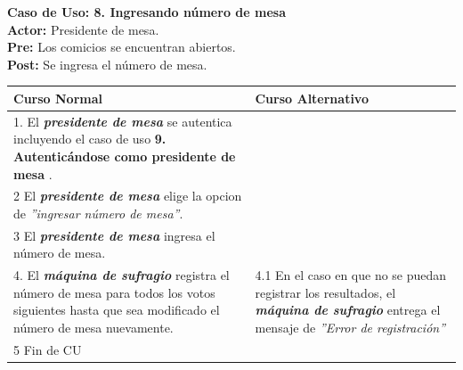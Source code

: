 \documentclass[spanish, 10pt,a4paper]{article}
\numberwithin{equation}{section} %
\begin{document}
\clearpage
\noindent\textbf{Caso de Uso: 8. Ingresando número de mesa}\\
\textbf{Actor: } Presidente de mesa.\\
\textbf{Pre: } Los comicios se encuentran abiertos.\\
\textbf{Post: } Se ingresa el número de mesa.\\
\begin{table}[H]
  \centering
\bgroup
\def\arraystretch{1.3}
  \begin{tabular}{p{9cm} | p{7cm}}
    \hline
    Curso Normal & Curso Alternativo \\
    \hline
    \hline    
    1. El \textbf{\textit{presidente de mesa}} se autentica incluyendo el caso de uso \textbf{ 9. Autenticándose como presidente de mesa} . 
    & \\
    
    \hline
    2 El \textbf{\textit{presidente de mesa}} elige la opcion de \textit{''ingresar número de mesa''}.
    & \\
    
    \hline
    3 El \textbf{\textit{presidente de mesa}} ingresa el número de mesa.
    \\
    
    \hline
    4. El \textbf{\textit{máquina de sufragio}} registra el número de mesa para todos los votos siguientes hasta que sea modificado el número de mesa nuevamente.
    &
    4.1 En el caso en que no se puedan registrar los resultados, el \textbf{\textit{máquina de sufragio}} entrega el mensaje de \textit{''Error de registración''}
    \\
    
    \hline
    5 Fin de CU
    & \\
    \hline
  \end{tabular}
\egroup
\end{table}
\end{document}
